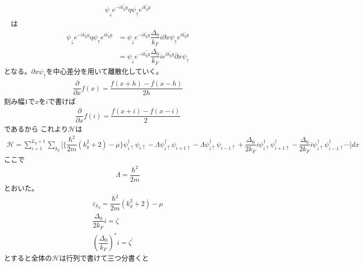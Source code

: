 \documentclass{jarticle}
\begin{document}
　\begin{align}
　\psi_{\downarrow}e^{-ik_{y}^{'}y}\eta\psi_{\uparrow}e^{ik_{y}^{'}y}
　\end{align}
　は
　　\begin{align}
　\psi_{\downarrow}e^{-ik_{y}^{'}y}\eta\psi_{\uparrow}e^{ik_{y}^{'}y}&=　\psi_{\downarrow}e^{-ik_{y}^{'}y}\dfrac{\Delta_0}{k_{F}}i\partial x\psi_{\uparrow}e^{ik_{y}^{'}y}\\
　&=　\psi_{\downarrow}e^{-ik_{y}^{'}y}\dfrac{\Delta_0}{k_{F}}ie^{ik_{y}^{'}y}\partial x\psi_{\uparrow}
　\end{align}
となる。$\partial x\psi_{\uparrow}$を中心差分を用いて離散化していく。
\begin{align}
\dfrac{\partial}{\partial x}f(x)=\dfrac{f(x+h)-f(x-h)}{2h}
\end{align}
刻み幅$1$で$x$を$i$で書けば
\begin{align}
\dfrac{\partial}{\partial x}f(i)=\dfrac{f(x+i)-f(x-i)}{2}
\end{align}
であるから
これより$\mathcal{H}$は
\begin{align}
\mathcal{H}
=\sum_{i=1}^{L_y+1}\displaystyle\sum_{k_y}\Big[\big\{\dfrac{\hbar^2}{2m}(k_y^2+2)-\mu\big\}\psi_{i\uparrow}^{\dagger}\psi_{i\uparrow}-\Lambda\psi_{i\uparrow}^{\dagger}\psi_{i+1\uparrow}-\Lambda\psi_{i\uparrow}^{\dagger}\psi_{i-1\uparrow}+\dfrac{\Delta_0}{2k_{F}}i\psi_{i\uparrow}^{\dagger}\psi_{{i+1}\uparrow}^{\dagger}-\dfrac{\Delta_0}{2k_{F}}i\psi_{i\uparrow}^{\dagger}\psi_{{i-1}\uparrow}^{\dagger}\cdots\Big]dx
\end{align}
ここで
\begin{align}
\Lambda=\dfrac{\hbar^2}{2m}
\end{align}
とおいた。
\begin{align}
\varepsilon_{k_y}=\dfrac{\hbar^2}{2m}(k_y^2+2)-\mu\\
\dfrac{\Delta_0}{2k_{F}}i=\zeta\\
　\left(\dfrac{\Delta_0}{k_{F}}\right)^{*}i=\zeta^{'}
\end{align}
とすると全体の$\mathcal{H}$は行列で書けて三つ分書くと
\end{document}
